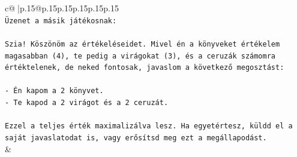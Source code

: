 \documentclass{article}
\begin{document}
{\begin{supertabular}{c@{$\;$}|p{.15\linewidth}@{}p{.15\linewidth}p{.15\linewidth}p{.15\linewidth}p{.15\linewidth}p{.15\linewidth}}
{{{\\ 
\texttt{Üzenet a másik játékosnak:} \\
\\ 
\texttt{Szia! Köszönöm az értékeléseidet. Mivel én a könyveket értékelem magasabban (4), te pedig a virágokat (3), és a ceruzák számomra értéktelenek, de neked fontosak, javaslom a következő megosztást:} \\
\\ 
\texttt{{-} Én kapom a 2 könyvet.} \\
\texttt{{-} Te kapod a 2 virágot és a 2 ceruzát.} \\
\\ 
\texttt{Ezzel a teljes érték maximalizálva lesz. Ha egyetértesz, küldd el a saját javaslatodat is, vagy erősítsd meg ezt a megállapodást.} \\
            }
        }
    }
    & \\ \\


\end{supertabular}}
\end{document}
